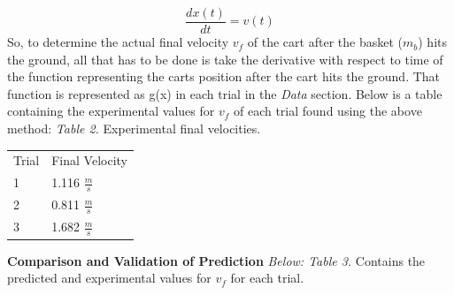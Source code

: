 \documentclass[12pt,letterpaper]{article}
\begin{document}
\begin{equation}
\frac{dx(t)}{dt} = v(t) 
\end{equation}
So, to determine the actual final velocity \(v_f\) of the cart after the basket (\(m_b\)) hits the ground, all that has to be done is take the derivative with respect to time of the function representing the carts position after the cart hits the ground. That function is represented as g(x) in each trial in the \textit{Data} section. Below is a table containing the experimental values for \(v_f\) of each trial found using the above method:
\newline\newline
\textit{Table 2.} Experimental final velocities.
{\renewcommand{\arraystretch}{1.2}
\begin{table}[h]
\hspace*{2.4in}
\begin{tabular}{ll}
Trial \hspace{12pt} &\hspace{12pt} Final Velocity\\
\hspace{10pt}1       & \hspace{30pt}1.116 \(\frac{m}{s}\)  \\   
\hspace{10pt}2       & \hspace{30pt}0.811 \(\frac{m}{s}\)   \\  
\hspace{10pt}3       & \hspace{30pt}1.682 \(\frac{m}{s}\)   \\  
\end{tabular}
\end{table}
}
\newline
\textbf{Comparison and Validation of Prediction}%
\newline\newline
\textit{Below: Table 3.} Contains the predicted and experimental values for \(v_f\) for each trial.
\end{document}
